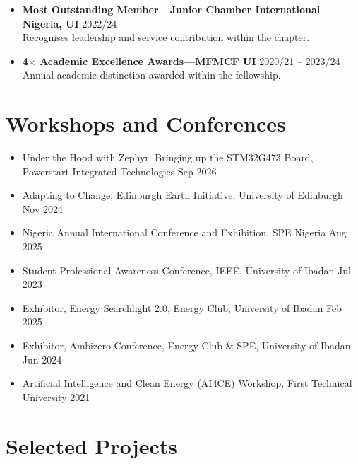 \documentclass[10pt, a4paper]{article}
\begin{document}
\begin{itemize}
        \footnotesize Awarded each session to the top-performing students in the Faculty.
  \item \textbf{Most Outstanding Member---Junior Chamber International Nigeria, UI} \hfill 2022/24\\
        \footnotesize Recognises leadership and service contribution within the chapter.
  \item \textbf{4$\times$ Academic Excellence Awards---MFMCF UI} \hfill 2020/21 -- 2023/24\\
        \footnotesize Annual academic distinction awarded within the fellowship.
\end{itemize}

\section{Workshops and Conferences}

\begin{itemize}
  \item Under the Hood with Zephyr: Bringing up the STM32G473 Board, Powerstart Integrated Technologies \hfill Sep 2026
  \item Adapting to Change, Edinburgh Earth Initiative, University of Edinburgh \hfill Nov 2024
  \item Nigeria Annual International Conference and Exhibition, SPE Nigeria \hfill Aug 2025
  \item Student Professional Awareness Conference, IEEE, University of Ibadan \hfill Jul 2023
  \item Exhibitor, Energy Searchlight 2.0, Energy Club, University of Ibadan \hfill Feb 2025
  \item Exhibitor, Ambizero Conference, Energy Club \& SPE, University of Ibadan \hfill Jun 2024
  \item Artificial Intelligence and Clean Energy (AI4CE) Workshop, First Technical University \hfill 2021
\end{itemize}

\section{Selected Projects}
\end{document}
